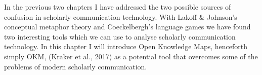 In the previous two chapters I have addressed the two possible sources of confusion in scholarly communication technology. With Lakoff & Johnson’s conceptual metaphor theory and Coeckelbergh’s language games we have found two interesting tools which we can use to analyse scholarly communication technology. In this chapter I will introduce Open Knowledge Maps, henceforth simply OKM, (Kraker et al., 2017) as a potential tool that overcomes some of the problems of modern scholarly communication.